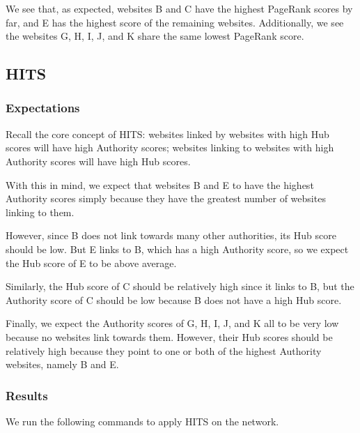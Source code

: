 \documentclass[12pt, titlepage, twoside]{amsart}
\begin{document}
We see that, as expected, websites B and C have the highest PageRank scores by far,
and E has the highest score of the remaining websites.
Additionally, we see the websites G, H, I, J, and K share the same lowest PageRank score.

\subsection{HITS}

\subsubsection{Expectations}

Recall the core concept of HITS:
websites linked by websites with high Hub scores will have high Authority scores;
websites linking to websites with high Authority scores will have high Hub scores.

With this in mind, we expect that websites B and E to have the highest Authority scores
simply because they have the greatest number of websites linking to them.

However, since B does not link towards many other authorities, its Hub score should be low.
But E links to B, which has a high Authority score, so we expect the Hub score of E to be above average.

Similarly, the Hub score of C should be relatively high since it links to B, but the Authority score of
C should be low because B does not have a high Hub score.

Finally, we expect the Authority scores of G, H, I, J, and K all to be very low
because no websites link towards them.
However, their Hub scores should be relatively high because they point to
one or both of the highest Authority websites, namely B and E.

\subsubsection{Results}

We run the following commands to apply HITS on the network.
\end{document}
